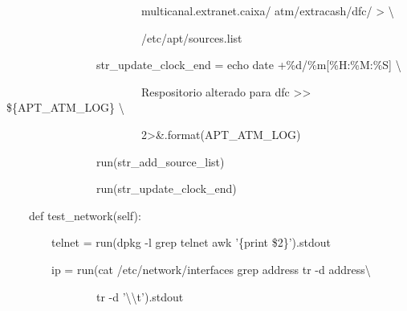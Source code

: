 {\ttfamily\color[rgb]{0.10980392,0.10980392,0.10980392}
    \ \ \ \ \ \ \ \ \ \ \ \ \ \ \ \ \ \ \ \ \ \ \ \ multicanal.extranet.caixa/ atm/extracash/dfc/{\textquotedbl}
    {\textgreater} {\textbackslash}}

{\ttfamily\color[rgb]{0.10980392,0.10980392,0.10980392}
    \ \ \ \ \ \ \ \ \ \ \ \ \ \ \ \ \ \ \ \ \ \ \ \ /etc/apt/sources.list{\textquotedbl}
    {\textquotedbl}{\textquotedbl}{\textquotedbl}}

{\ttfamily\color[rgb]{0.10980392,0.10980392,0.10980392}
    \ \ \ \ \ \ \ \ \ \ \ \ \ \ \ \ str\_update\_clock\_end = {\textquotedbl}{\textquotedbl}{\textquotedbl}echo
    {\textquotedbl}{\textasciigrave}date +\%d/\%m[\%H:\%M:\%S]{\textasciigrave} {\textbackslash}}

{\ttfamily\color[rgb]{0.10980392,0.10980392,0.10980392}
    \ \ \ \ \ \ \ \ \ \ \ \ \ \ \ \ \ \ \ \ \ \ \ \ Respositorio alterado para dfc{\textquotedbl}
    {\textgreater}{\textgreater} \$\{APT\_ATM\_LOG\} {\textbackslash}}

{\ttfamily\color[rgb]{0.10980392,0.10980392,0.10980392}
    \ \ \ \ \ \ \ \ \ \ \ \ \ \ \ \ \ \ \ \ \ \ \ \ 2{\textgreater}\&{\textquotedbl}{\textquotedbl}{\textquotedbl}.format(APT\_ATM\_LOG)}


    \bigskip

{\ttfamily\color[rgb]{0.10980392,0.10980392,0.10980392}
    \ \ \ \ \ \ \ \ \ \ \ \ \ \ \ \ run(str\_add\_source\_list)}

{\ttfamily\color[rgb]{0.10980392,0.10980392,0.10980392}
    \ \ \ \ \ \ \ \ \ \ \ \ \ \ \ \ run(str\_update\_clock\_end)}


    \bigskip

{\ttfamily\color[rgb]{0.10980392,0.10980392,0.10980392}
    \ \ \ \ def test\_network(self):}

{\ttfamily\color[rgb]{0.10980392,0.10980392,0.10980392}
    \ \ \ \ \ \ \ \ telnet = run({\textquotedbl}dpkg -l {\textbar}grep telnet {\textbar}awk '\{print
            \$2\}'{\textquotedbl}).stdout}

{\ttfamily\color[rgb]{0.10980392,0.10980392,0.10980392}
    \ \ \ \ \ \ \ \ ip = run({\textquotedbl}{\textquotedbl}{\textquotedbl}cat /etc/network/interfaces {\textbar}grep address
            {\textbar}tr -d {\textquotedbl}address{\textquotedbl}{\textbackslash}}

            {\ttfamily\color[rgb]{0.10980392,0.10980392,0.10980392}
            \ \ \ \ \ \ \ \ \ \ \ \ \ \ \ \ {\textbar}tr -d
            '{\textbackslash}{\textbackslash}t'{\textquotedbl}{\textquotedbl}{\textquotedbl}).stdout}


